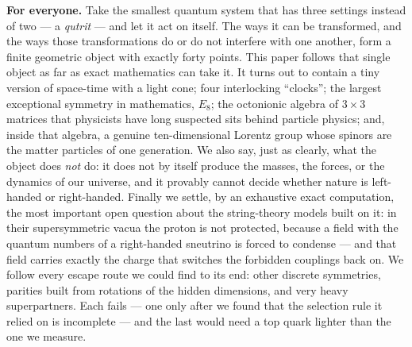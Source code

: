 \documentclass[11pt,twoside]{article}
\theoremstyle{plain}
\theoremstyle{definition}
\theoremstyle{remark}
\begin{document}
\textbf{For everyone.} Take the smallest quantum system that has three settings
instead of two --- a \emph{qutrit} --- and let it act on itself. The ways it can be
transformed, and the ways those transformations do or do not interfere with one
another, form a finite geometric object with exactly forty points. This paper follows
that single object as far as exact mathematics can take it. It turns out to contain
a tiny version of space-time with a light cone; four interlocking ``clocks''; the
largest exceptional symmetry in mathematics, $E_8$; the octonionic algebra of
$3\times3$ matrices that physicists have long suspected sits behind particle physics;
and, inside that algebra, a genuine ten-dimensional Lorentz group whose spinors are
the matter particles of one generation. We also say, just as clearly, what the
object does \emph{not} do: it does not by itself produce the masses, the forces, or
the dynamics of our universe, and it provably cannot decide whether nature is
left-handed or right-handed. Finally we settle, by an exhaustive exact computation, the
most important open question about the string-theory models built on it: in their
supersymmetric vacua the proton is not protected, because a field with the quantum numbers
of a right-handed sneutrino is forced to condense --- and that field carries exactly the charge
that switches the forbidden couplings back on. We follow every escape route we could find to
its end: other discrete symmetries, parities built from rotations of the hidden dimensions,
and very heavy superpartners. Each fails --- one only after we found that the selection rule it
relied on is incomplete --- and the last would need a top quark lighter than the one we measure.
\end{document}
